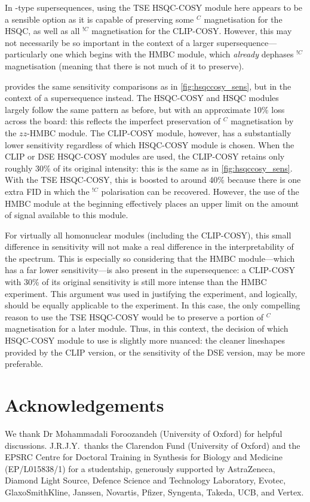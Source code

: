 \documentclass[a4paper,12pt]{article}
\newcommand{\meshort}{J.R.J.Y.}
\newcommand{\carbon}{\ch{^{13}C}}
\newcommand{\magn}[1]{\ch{^1H}$^{#1}$}
\newcommand{\magnnot}[1]{\ch{^1H}$^{!#1}$}
\begin{document}
\begin{refsection}
In -type supersequences, using the TSE HSQC-COSY module here appears to be a sensible option as it is capable of preserving some \magn{C} magnetisation for the HSQC, as well as all \magnnot{C} magnetisation for the CLIP-COSY.
However, this may not necessarily be so important in the context of a larger supersequence---particularly one which begins with the HMBC module, which \textit{already} dephases \magnnot{C} magnetisation (meaning that there is not much of it to preserve).

 provides the same sensitivity comparisons as in \cref{fig:hsqccosy_sens}, but in the context of a  supersequence instead.
The HSQC-COSY and HSQC modules largely follow the same pattern as before, but with an approximate 10\% loss across the board: this reflects the imperfect preservation of \magn{C} magnetisation by the $zz$-HMBC module.
The CLIP-COSY module, however, has a substantially lower sensitivity regardless of which HSQC-COSY module is chosen.
When the CLIP or DSE HSQC-COSY modules are used, the CLIP-COSY retains only roughly 30\% of its original intensity: this is the same as in \cref{fig:hsqccosy_sens}.
With the TSE HSQC-COSY, this is boosted to around 40\% because there is one extra FID in which the \magnnot{C} polarisation can be recovered.
However, the use of the HMBC module at the beginning effectively places an upper limit on the amount of signal available to this module.

For virtually all homonuclear modules (including the CLIP-COSY), this small difference in sensitivity will not make a real difference in the interpretability of the spectrum.
This is especially so considering that the HMBC module---which has a far lower sensitivity---is also present in the supersequence:
a CLIP-COSY with 30\% of its original sensitivity is still more intense than the HMBC experiment.
This argument was used in justifying the  experiment, and logically, should be equally applicable to the  experiment.
In this case, the only compelling reason to use the TSE HSQC-COSY would be to preserve a portion of \magn{C} magnetisation for a later \carbon{} module.
Thus, in this context, the decision of which HSQC-COSY module to use is slightly more nuanced: the cleaner lineshapes provided by the CLIP version, or the sensitivity of the DSE version, may be more preferable.


\section*{Acknowledgements}

We thank Dr Mohammadali Foroozandeh (University of Oxford) for helpful discussions.
\meshort{}\ thanks the Clarendon Fund (University of Oxford) and the EPSRC Centre for Doctoral Training in Synthesis for Biology and Medicine (EP/L015838/1) for a studentship, generously supported by AstraZeneca, Diamond Light Source, Defence Science and Technology Laboratory, Evotec, GlaxoSmithKline, Janssen, Novartis, Pfizer, Syngenta, Takeda, UCB, and Vertex.

\AtNextBibliography{\small}
\printbibliography{}
\end{refsection}
\end{document}
